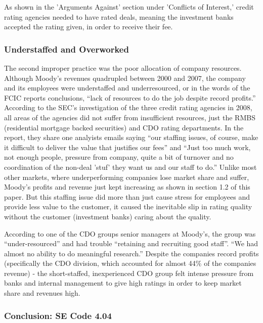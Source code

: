 \documentclass[11pt]{article}
\begin{document}
\begin{multicols}{2}
As shown in the 'Arguments Against' section under 'Conflicts of Interest,' credit rating agencies needed to have rated deals, meaning the investment banks accepted the rating given, in order to receive their fee. \cite[p. 210]{govtReport} 

\subsubsection{\textbf{Understaffed and Overworked}}

The second improper practice was the poor allocation of company resources.  Although Moody's revenues quadrupled between 2000 and 2007, the company and its employees were understaffed and underresourced, or in the words of the FCIC reports conclusions, ``lack of resources to do the job despite record profits.''\cite[p. xxv]{govtReport}  According to the SEC's investigation of the three credit rating agencies in 2008, all areas of the agencies did not suffer from insufficient resources, just the RMBS (residential mortgage backed securities) and CDO rating departments. \cite{secCRAreport}  In the report, they share one analyists emails saying ``our staffing issues, of course, make it difficult to deliver the value that justifies our fees'' and ``Just too much work, not enough people, pressure from company, quite a bit of turnover and no coordination of the non-deal 'stuf' they want us and our staff to do.'' \cite{secCRAreport}  Unlike most other markets, where underperforming companies lose market share and suffer, Moody's profits and revenue just kept increasing as shown in section 1.2 of this paper.  But this staffing issue did more than just cause stress for employees and provide less value to the customer, it caused the inevitable slip in rating quality without the customer (investment banks) caring about the quality.   

According to one of the CDO groups senior managers at Moody's, the group was ``under-resourced'' and had trouble ``retaining and recruiting good staff''. ``We had almost no ability to do meaningful research.'' \cite[p. 149]{govtReport}  Despite the companies record profits (specifically the CDO division, which accounted for almost 44\% of the companies revenue) - the short-staffed, inexperienced CDO group felt intense pressure from banks and internal management to give high ratings in order to keep market share and revenues high. \cite[pg. 149-150]{govtReport}

\subsubsection{\textbf{Conclusion: SE Code 4.04}}  


\end{multicols}
\end{document}
